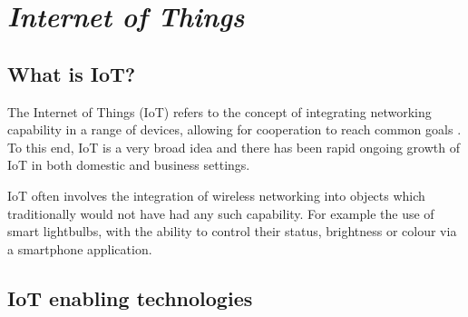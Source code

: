 \section{\emph{Internet of Things}}

\subsection{What is IoT?}

The Internet of Things (IoT) refers to the concept of integrating networking
capability in a range of devices, allowing for cooperation to reach common goals
\cite{atzori2010}. To this end, IoT is a very broad idea and there has been
rapid ongoing growth of IoT in both domestic and business settings.

IoT often involves the integration of wireless networking into objects which
traditionally would not have had any such capability. For example the use of
smart lightbulbs, with the ability to control their status, brightness or colour
via a smartphone application.

\subsection{IoT enabling technologies}